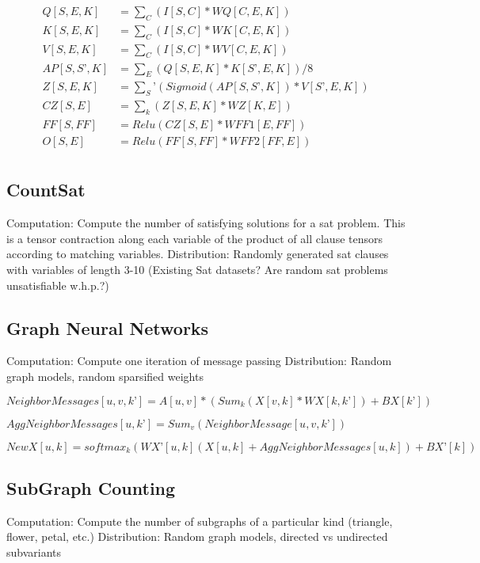 \documentclass{article}
\begin{document}
 \begin{align*}
Q[S, E, K] &= \sum_C(I[S, C] * WQ[C, E, K])\\
K[S, E, K] &= \sum_C(I[S, C] * WK[C, E, K])\\
V[S, E, K] &= \sum_C(I[S, C] * WV[C, E, K])\\
AP[S, S’, K] &= \sum_E(Q[S, E, K] * K[S’, E, K]) / 8\\
Z[S, E, K] &= \sum_S’(Sigmoid(AP[S,S’,K]) * V[S’, E, K])\\
CZ[S, E] &= \sum_k(Z[S, E, K] * WZ[K,E])\\
FF[S,FF] &= Relu(CZ[S,E] * WFF1[E,FF])\\
O[S,E] &= Relu(FF[S,FF] * WFF2[FF,E])\\
\end{align*}

\subsection{CountSat}
	Computation: Compute the number of satisfying solutions for a sat problem. This is a tensor contraction along each variable of the product of all clause tensors according to matching variables.
	Distribution: Randomly generated sat clauses with variables of length 3-10 (Existing Sat datasets? Are random sat problems unsatisfiable w.h.p.?)

\subsection{Graph Neural Networks}
	Computation: Compute one iteration of message passing
	Distribution: Random graph models, random sparsified weights

$NeighborMessages[u, v, k’] = A[u, v]*(Sum_k(X[v, k]*WX[k, k’]) +BX[k’])  $

$AggNeighborMessages[u, k’] = Sum_v(NeighborMessage[u, v, k’])$

$NewX[u, k] = softmax_k(WX’[u,k](X[u, k] +AggNeighborMessages[u,k]) + BX’[k]) $

\subsection{SubGraph Counting}
	Computation: Compute the number of subgraphs of a particular kind (triangle, flower, petal, etc.)
	Distribution: Random graph models, directed vs undirected subvariants
\end{document}
